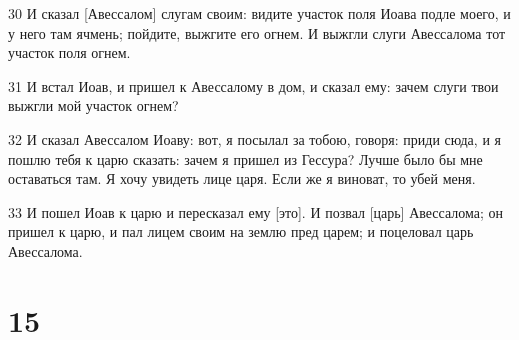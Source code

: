 \par 30 И сказал [Авессалом] слугам своим: видите участок поля Иоава подле моего, и у него там ячмень; пойдите, выжгите его огнем. И выжгли слуги Авессалома тот участок поля огнем.
\par 31 И встал Иоав, и пришел к Авессалому в дом, и сказал ему: зачем слуги твои выжгли мой участок огнем?
\par 32 И сказал Авессалом Иоаву: вот, я посылал за тобою, говоря: приди сюда, и я пошлю тебя к царю сказать: зачем я пришел из Гессура? Лучше было бы мне оставаться там. Я хочу увидеть лице царя. Если же я виноват, то убей меня.
\par 33 И пошел Иоав к царю и пересказал ему [это]. И позвал [царь] Авессалома; он пришел к царю, и пал лицем своим на землю пред царем; и поцеловал царь Авессалома.

\chapter{15}


